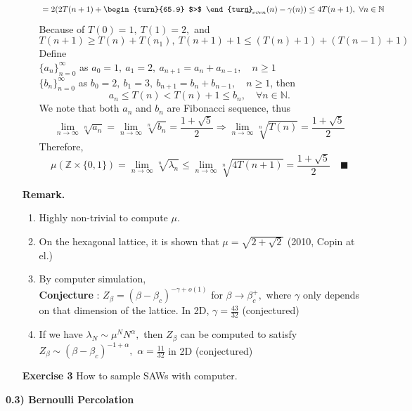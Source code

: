 \documentclass[12pt,a4paper]{article}
\newcommand{\indecate}{\mbox{\begin{turn}{65.9}
$>$
\end{turn}\hspace{-10.5pt}\parbox[t][-5pt][c]{10pt}{$\bot$}\hspace{-4.35pt}\parbox[t][-3.4pt][c]{4pt}{$\shortmid$}}}
\begin{document}
\begin{enumerate}
\begin{enumerate}
\begin{align*}
		    &=2(2T(n+1)+\indecate_{even}(n)-\gamma(n))\leq 4T(n+1),\ \forall n\in\mathbb{N}
		\end{align*}
		Because of $T(0)=1,\ T(1)=2,$ and 
		\[ 
		T(n+1)\geq T(n)+T(n_1),\ T(n+1)+1\leq (T(n)+1)+(T(n-1)+1)
		\]
		Define\\
		$\{a_n\}_{n=0}^\infty$ as $a_0=1,\ a_1=2,\ a_{n+1}=a_n+a_{n-1},\quad n\geq 1$\\
		$\{b_n\}_{n=0}^\infty$ as $b_0=2,\ b_1=3,\ b_{n+1}=b_n+b_{n-1},\quad n\geq 1$, then 
		\[
		a_n\leq T(n)<T(n)+1\leq b_n,\quad \forall n\in\mathbb{N}.
		\]
		We note that both $a_n$ and $b_n$ are Fibonacci sequence, thus
		\[
		\lim_{n\to\infty}\sqrt[n]{a_n}=\lim_{n\to\infty}\sqrt[n]{b_n}=\frac{1+\sqrt{5}}{2}\Rightarrow \lim_{n\to\infty}\sqrt[n]{T(n)}=\frac{1+\sqrt{5}}{2}
		\]
		Therefore,
		\[
		\mu(\mathbb{Z}\times \{0,1\})=\lim_{n\to\infty}\sqrt[n]{\lambda_n}\leq \lim_{n\to\infty}\sqrt[n]{4T(n+1)}=\frac{1+\sqrt{5}}{2}\quad \blacksquare
		\]
	\end{enumerate}
	\item[\textbf{Remark.}] \begin{enumerate}
		\item Highly non-trivial to compute $\mu.$
		\item On the hexagonal lattice, it is shown that $\mu=\sqrt{2+\sqrt{2}}$ (2010, Copin at el.)
		\item By computer simulation,\\
		\textbf{Conjecture} : $Z_\beta=(\beta-\beta_c)^{-\gamma+o(1)}$ for $\beta\to \beta_c^+,$ where $\gamma$ only depends on that dimension of the lattice. In 2D, $\gamma=\frac{43}{32}$ (conjectured)
		\item If we have $\lambda_N\sim \mu^NN^\alpha ,$ then $Z_\beta$ can be computed to satisfy $Z_\beta\sim (\beta-\beta_c)^{-1+\alpha},$ $\alpha=\frac{11}{32}$ in 2D (conjectured) 
	\end{enumerate}
	\item[\textbf{Exercise 3}] How to sample SAWs with computer.
\end{enumerate}
\newpage
\begin{flushleft}
	\Large \textbf{0.3) Bernoulli Percolation}
\end{flushleft}
\end{document}
